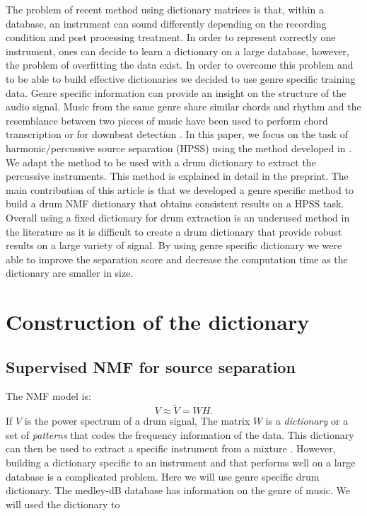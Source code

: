 \documentclass{article}
\begin{document}
The problem of recent method using dictionary matrices is that, within a database, an instrument can sound differently depending on the recording condition and post processing treatment. In order to represent correctly one instrument, ones can decide to learn a dictionary on a large database, however, the problem of overfitting the data exist. In order to overcome this problem and to be able to build effective dictionaries we decided to use genre specific training data. Genre specific information can provide an insight on the structure of the audio signal. Music from the same genre share similar chords and rhythm and the resemblance between two pieces of music have been used to perform chord transcription \cite{ni2012using,lee2008acoustic} or for downbeat detection \cite{hockman2012one}. 
In this paper, we focus on the task of harmonic/percussive source separation (HPSS) using the method developed in \cite{laroche2015structured}. We adapt the method to be used with a drum dictionary to extract the percussive instruments. This method is explained in detail in the preprint. 
The main contribution of this article is that we developed a genre specific method to build a drum NMF dictionary that obtains consistent results on a HPSS task. Overall using a fixed dictionary for drum extraction is an underused method in the literature as it is difficult to create a drum dictionary that provide robust results on a large variety of signal. By using genre specific dictionary we were able to improve the separation score and decrease the computation time as the dictionary are smaller in size. 
 




\section{Construction of the dictionary}


\subsection{Supervised NMF for source separation}

The NMF model is:
\begin{equation}
V \approx \tilde{V} = WH.
\end{equation}
If $V$ is the power spectrum of a drum signal, The matrix $W$ is a {\em dictionary} or a set of {\em patterns} that codes the frequency information of the data. This dictionary can then be used to extract a specific instrument from a mixture \cite{jaureguiberry2011adaptation,kim2011nonnegative}. However, building a dictionary specific to an instrument and that performs well on a large database is a complicated problem. Here we will use genre specific drum dictionary. The medley-dB database has information on the genre of music. We will used the dictionary to  
\end{document}
